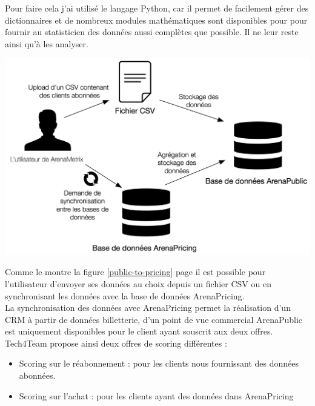 Pour faire cela j'ai utilisé le langage Python, car il permet de facilement gérer des dictionnaires et de nombreux modules mathématiques sont disponibles pour pour fournir au statisticien des données aussi complètes que possible. Il ne leur reste ainsi qu'à les analyser.

\begin{center}
\includegraphics[scale=0.7]{images/public-to-pricing.png}
\label{public-to-pricing}
\end{center}

Comme le montre la figure \ref{public-to-pricing} page \pageref{public-to-pricing} il est possible pour l'utilisateur d'envoyer ses données au choix depuis un fichier CSV ou en synchronisant les données avec la base de données ArenaPricing. 
\\

La synchronisation des données avec ArenaPricing permet la réalisation d'un CRM à partir de données billetterie, d'un point de vue commercial ArenaPublic est uniquement disponibles pour le client ayant souscrit aux deux offres. 
\\

Tech4Team propose ainsi deux offres de scoring différentes : 

\begin{itemize}
  \item[\textbullet] Scoring sur le réabonnement : pour les clients nous fournissant des données abonnées. 
  \item[\textbullet] Scoring sur l'achat : pour les clients ayant des données dans ArenaPricing  
\end{itemize} 



